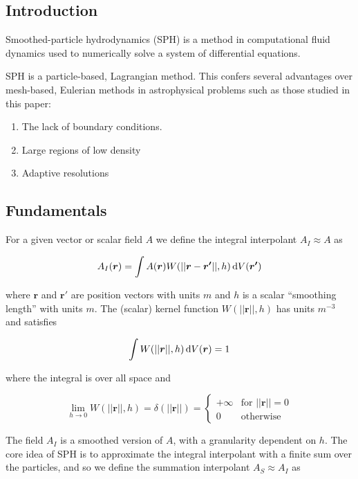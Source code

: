 \documentclass[../main.tex]{subfiles}
\begin{document}
\subsection{Introduction}
Smoothed-particle hydrodynamics (SPH) is a method in computational fluid dynamics used to
numerically solve a system of differential equations. 

SPH is a particle-based, Lagrangian method. This confers several advantages over mesh-based,
Eulerian methods in astrophysical problems such as those studied in this paper:
\begin{enumerate}
    \item The lack of boundary conditions.
    \item Large regions of low density
    \item Adaptive resolutions
\end{enumerate}


\subsection{Fundamentals}
For a given vector or scalar field $A$ we define the integral interpolant $A_I \approx A$ as

\begin{equation}
    A_I(\bm{r})
    = \int A(\bm{r}) W(||\bm{r} - \bm{r'}||, h) \,\mathrm{d} V(\bm{r'})
\end{equation}

where $\bm{r}$ and $\bm{r'}$ are position vectors with units $m$ and $h$ is a scalar ``smoothing
length'' with units $m$. The (scalar) kernel function $W(||\bm{r}||, h)$ has units $m^{-3}$ and
satisfies

\begin{equation}
    \int W(||\bm{r}||, h) \,\mathrm{d} V(\bm{r}) = 1
\end{equation}

where the integral is over all space and

\begin{equation}
    \lim_{h\to0} W(||\bm{r}||, h)
    = \delta(||\bm{r}||)
    = \begin{cases}
        +\infty & \text{for } ||\bm{r}|| = 0 \\
        0 & \text{otherwise} \end{cases}
\end{equation}

The field $A_I$ is a smoothed version of $A$, with a granularity dependent on $h$. The core idea of
SPH is to approximate the integral interpolant with a finite sum over the particles, and so we
define the summation interpolant $A_S \approx A_I$ as
\end{document}
